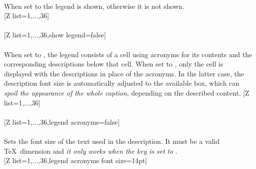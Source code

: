 \\ [0pt]\pgfPTendstyle%
\label{option_show legend}%
%
{When set to  the legend is shown, otherwise it is not shown.}%
\\ [5pt][Z list={1,...,36}]%
\\ [10pt]\makebox[\linewidth][c]{\scalebox{.6}{\pgfPT[Z list={1,...,36}]}}%
\\ [5pt][Z list={1,...,36},show legend=false]%
\\ [10pt]\makebox[\linewidth][c]{\scalebox{.6}{\pgfPT[Z list={1,...,36},show legend=false]}}%
\\ [0pt]\pgfPTendoption%
\vfill%
\label{option_legend acronyms}%
%
{When set to , the legend consists of a cell using acronyms for its contents and the corres\-ponding des\-criptions below that cell.
When set to , only the cell is displayed with the des\-criptions in place of the acronyms. In the latter case, the description font size is automatically adjusted to the available box, which can \textit{spoil the appearance of the whole caption}, depending on the described content.
}%
\vfill%
\newpage%
[Z list={1,...,36}]%
\\ [10pt]\makebox[\linewidth][c]{\scalebox{.6}{\pgfPT[Z list={1,...,36}]}}%
\\ [5pt][Z list={1,...,36},legend acronyms=false]%
\\ [10pt]\makebox[\linewidth][c]{\scalebox{.6}{\pgfPT[Z list={1,...,36},legend acronyms=false]}}%
\\ [0pt]\pgfPTendoption%
\label{option_legend_acronyms_font_size}%
\vfill%
%
{Sets the font size of the text used in the  description. It must be a valid \TeX\ dimension and \textit{it only works when the key  is set to }.
\vskip0pt\relax}%
\\ [5pt][Z list={1,...,36},legend acronyms font size=14pt]%
\\ [10pt]\makebox[\linewidth][c]{\scalebox{.6}{\pgfPT[Z list={1,...,36},legend acronyms font size=14pt]}}%
\\ [0pt]\pgfPTendoption%
\vfill%
\newpage\vspace{-34pt}\ %
